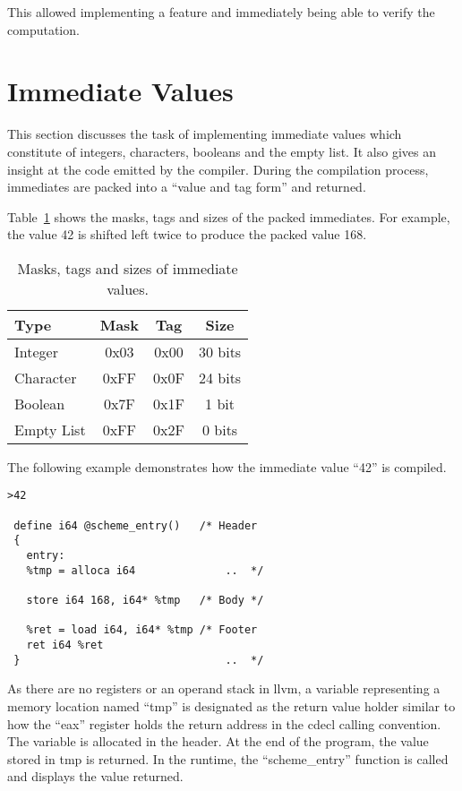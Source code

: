 \documentclass{article}
\begin{document}
This allowed implementing a feature and immediately being able to verify the computation.




\section{Immediate Values}

This section discusses the task of implementing immediate values which constitute of integers, characters, booleans and the empty list. It also gives an insight at the code emitted by the compiler. During the compilation process, immediates are packed into a ``value and tag form'' and returned.

Table~\ref{tab:immediates} shows the masks, tags and sizes of the packed immediates. For example, the value 42 is shifted left twice to produce the packed value 168. 

\begin{table}[ht]
  \centering
\begin{tabular}{ l c c c }
  \toprule
  Type & Mask & Tag & Size \\ \hline
  \midrule
  Integer & 0x03 & 0x00 & 30 bits  \\
  Character & 0xFF & 0x0F & 24 bits  \\
  Boolean & 0x7F & 0x1F & 1 bit \\
  Empty List & 0xFF & 0x2F & 0 bits \\
  \bottomrule
\end{tabular}
\caption{Masks, tags and sizes of immediate values.} \label{tab:immediates}
\end{table}

The following example demonstrates how the immediate value ``42'' is compiled. 

\begin{verbatim}
>42

 define i64 @scheme_entry()   /* Header 
 {                            
   entry:
   %tmp = alloca i64              ..  */

   store i64 168, i64* %tmp   /* Body */ 

   %ret = load i64, i64* %tmp /* Footer
   ret i64 %ret                   
 }                                ..  */
\end{verbatim}

As there are no registers or an operand stack in llvm, a variable representing a memory location named ``tmp'' is designated as the return value holder similar to how the ``eax'' register holds the return address in the cdecl calling convention. The variable is allocated in the header. At the end of the program, the value stored in tmp is returned. In the runtime, the ``scheme\_entry'' function is called and displays the value returned. 
\end{document}
